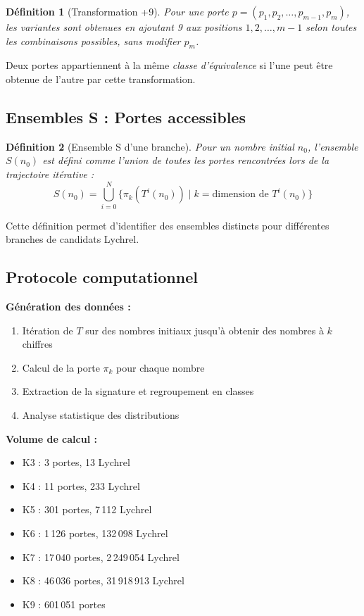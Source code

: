 \documentclass[12pt,a4paper]{article}
\newtheorem{definition}{Définition}[section]
\theoremstyle{remark}
\begin{document}
\begin{definition}[Transformation +9]
Pour une porte $p = (p_1, p_2, \ldots, p_{m-1}, p_m)$, les variantes sont obtenues en ajoutant 9 aux positions $1, 2, \ldots, m-1$ selon toutes les combinaisons possibles, sans modifier $p_m$.
\end{definition}

Deux portes appartiennent à la même \textit{classe d'équivalence} si l'une peut être obtenue de l'autre par cette transformation.

\subsection{Ensembles S : Portes accessibles}

\begin{definition}[Ensemble S d'une branche]
Pour un nombre initial $n_0$, l'ensemble $S(n_0)$ est défini comme l'union de toutes les portes rencontrées lors de la trajectoire itérative :
\[
S(n_0) = \bigcup_{i=0}^{N} \{\pi_k(T^i(n_0)) \mid k = \text{dimension de } T^i(n_0)\}
\]
\end{definition}

Cette définition permet d'identifier des ensembles distincts pour différentes branches de candidats Lychrel.

\subsection{Protocole computationnel}

\textbf{Génération des données :}
\begin{enumerate}
\item Itération de $T$ sur des nombres initiaux jusqu'à obtenir des nombres à $k$ chiffres
\item Calcul de la porte $\pi_k$ pour chaque nombre
\item Extraction de la signature et regroupement en classes
\item Analyse statistique des distributions
\end{enumerate}

\textbf{Volume de calcul :}
\begin{itemize}
\item K3 : 3 portes, 13 Lychrel
\item K4 : 11 portes, 233 Lychrel
\item K5 : 301 portes, 7\,112 Lychrel
\item K6 : 1\,126 portes, 132\,098 Lychrel
\item K7 : 17\,040 portes, 2\,249\,054 Lychrel
\item K8 : 46\,036 portes, 31\,918\,913 Lychrel
\item K9 : 601\,051 portes
\end{itemize}
\end{document}
